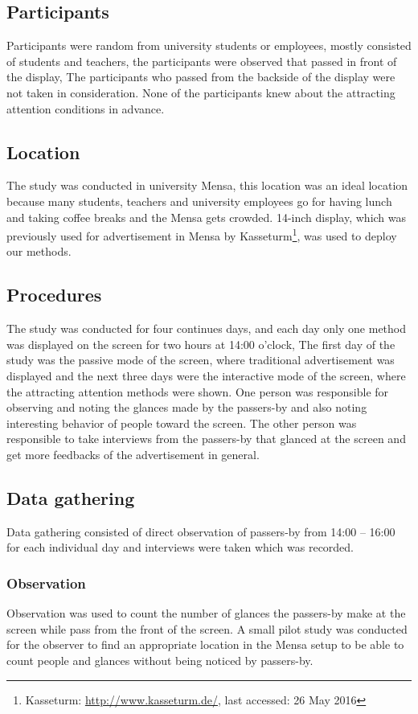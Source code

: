 \subsection{Participants}
Participants were random from university students or employees, mostly consisted of students and teachers, the participants were observed that passed in front of the display, The participants who passed from the backside of the display were not taken in consideration. None of the participants knew about the attracting attention conditions in advance.

\subsection{Location}
The study was conducted in university Mensa, this location was an ideal location because many students, teachers and university employees go for having lunch and taking coffee breaks and the Mensa gets crowded. 14-inch display, which was previously used for advertisement in Mensa by Kasseturm\footnote{Kasseturm: \url{http://www.kasseturm.de/}, last accessed: 26 May 2016}, was used to deploy our methods.

\subsection{Procedures}
The study was conducted for four continues days, and each day only one method was displayed on the screen for two hours at 14:00 o’clock, The first day of the study was the passive mode of the screen, where traditional advertisement was displayed and the next three days were the interactive mode of the screen, where the attracting attention methods were shown. One person was responsible for observing and noting the glances made by the passers-by and also noting interesting behavior of people toward the screen. The other person was responsible to take interviews from the passers-by that glanced at the screen and get more feedbacks of the advertisement in general.

\subsection{Data gathering}
Data gathering consisted of direct observation of passers-by from 14:00 – 16:00 for each individual day and interviews were taken which was recorded. 

\subsubsection{Observation}
Observation was used to count the number of glances the passers-by make at the screen while pass from the front of the screen. A small pilot study was conducted for the observer to find an appropriate location in the Mensa setup to be able to count people and glances without being noticed by passers-by.

